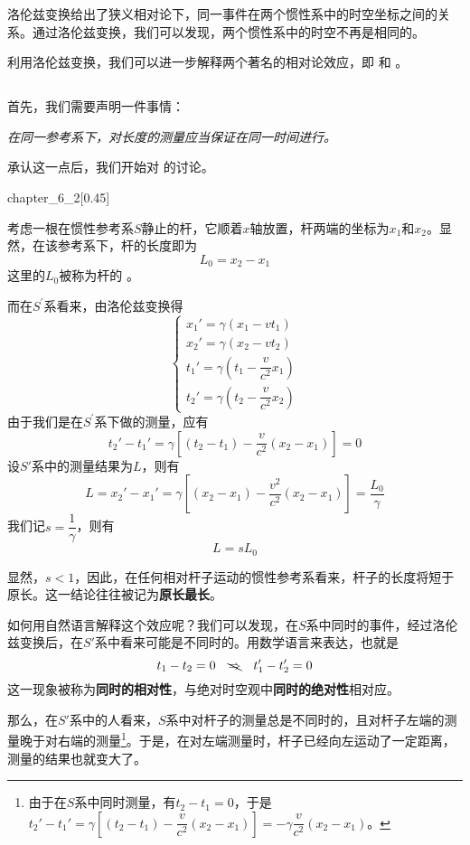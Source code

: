 洛伦兹变换给出了狭义相对论下，同一事件在两个惯性系中的时空坐标之间的关系。通过洛伦兹变换，我们可以发现，两个惯性系中的时空不再是相同的。

利用洛伦兹变换，我们可以进一步解释两个著名的相对论效应，即\linebreak{} 和 。
\subsection[尺缩效应]{}
首先，我们需要声明一件事情：
\begin{center}
	\em 在同一参考系下，对长度的测量应当保证在同一时间进行。
\end{center}
承认这一点后，我们开始对  的讨论。
\begin{singlefigure}{chapter_6_2}[0.45]
\end{singlefigure}
考虑一根在惯性参考系$S$静止的杆，它顺着$x$轴放置，杆两端的坐标为$x_1$和$x_2$。显然，在该参考系下，杆的长度即为$ $
\[L_0=x_2-x_1\]
这里的$L_0$被称为杆的 。

而在$S^{\prime}$系看来，由洛伦兹变换得
\[\left\{\begin{array}{l}
	x_{1}'=\gamma(x_1-vt_1)\\
	x_{2}'=\gamma(x_2-vt_2)\\
	t_1'=\gamma(t_1-\dfrac{v}{c^2} x_1)\\[1ex]
	t_2'=\gamma(t_2-\dfrac{v}{c^2} x_2)
\end{array}\right.\]
由于我们是在$S^{\prime}$系下做的测量，应有
\[t_2'-t_1'=\gamma[(t_2-t_1)-\dfrac{v}{c^2} (x_2-x_1)]=0\]
设$S'$系中的测量结果为$L$，则有
\[L=x_2'-x_1'=\gamma[(x_2-x_1)-\dfrac{v^2}{c^2}(x_2-x_1)]=\dfrac{L_0}{\gamma}\]
我们记$s=\dfrac{1}{\gamma}$，则有
\begin{equation}
	L=sL_0
\end{equation}

显然，$s<1$，因此，在任何相对杆子运动的惯性参考系看来，杆子的长度将短于原长。这一结论往往被记为\textbf{原长最长}。

如何用自然语言解释这个效应呢？我们可以发现，在$S$系中同时的事件，经过洛伦兹变换后，在$S'$系中看来可能是不同时的。用数学语言来表达，也就是
\[
	t_1-t_2=0\quad \bcancel{\Rightarrow}\quad t_1'-t_2'=0
\]
这一现象被称为\textbf{同时的相对性}，与绝对时空观中\textbf{同时的绝对性}相对应。

那么，在$S'$系中的人看来，$S$系中对杆子的测量总是不同时的，且对杆子左端的测量晚于对右端的测量\footnote{由于在$S$系中同时测量，有$t_2-t_1=0$，于是$t_2'-t_1'=\gamma[(t_2-t_1)-\dfrac{v}{c^2} (x_2-x_1)]=-\gamma \dfrac{v}{c^2} (x_2-x_1)$。}。于是，在对左端测量时，杆子已经向左运动了一定距离，测量的结果也就变大了。

